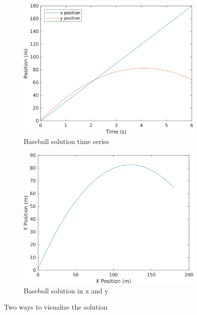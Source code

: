\begin{figure}[h]
    \centering
    \begin{subfigure}{0.45\textwidth}
        \centering
        \includegraphics[width=\linewidth]{../code/chap_twodimensions/baseball_time.png}
        \caption{Baseball solution time series}
    \end{subfigure}
    \quad %
    \begin{subfigure}{0.45\textwidth}
        \centering
        \includegraphics[width=\linewidth]{../code/chap_twodimensions/baseball_xy.png}
        \caption{Baseball solution in x and y}
    \end{subfigure}
    \caption{Two ways to visualize the solution}
    \label{f:baseball1}
\end{figure}

